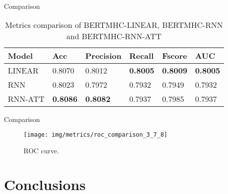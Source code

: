 \documentclass[10pt]{beamer}
\newcommand{\1}{
	\setbeamertemplate{background}{
		\texttt{[image: img/1]}
		\tikz[overlay] \fill[fill opacity=0.75,fill=white] (0,0) rectangle (-\paperwidth,\paperheight);
	}
}
\begin{document}
\begin{frame}{Comparison}{}
	
\begin{table}[]
	\caption{Metrics comparison of BERTMHC-LINEAR, BERTMHC-RNN and BERTMHC-RNN-ATT}
	\setlength{\tabcolsep}{0.8em} %
	{\renewcommand{\arraystretch}{1.3}%
	\begin{tabular}{llllll}
		\textbf{Model} & \textbf{Acc} & \textbf{Precision} & \textbf{Recall} & \textbf{Fscore} & \textbf{AUC} \\ \hline
		LINEAR & 0.8070       & 0.8012             & \textbf{0.8005}          & \textbf{0.8009}          & \textbf{0.8005}       \\
		RNN & 0.8023       & 0.7972             & 0.7932          & 0.7949          & 0.7932       \\
		RNN-ATT & \textbf{0.8086}       & \textbf{0.8082}             & 0.7937          & 0.7985          & 0.7937      
	\end{tabular}
}
\end{table}
\end{frame}



\begin{frame}{Comparison}{}
	\begin{figure}[H]
		\centering
		\texttt{[image: img/metrics/roc\_comparison\_3\_7\_8]}	
		\caption{ROC curve.}		
	\end{figure}
\end{frame}




\section{Conclusions}
\end{document}
